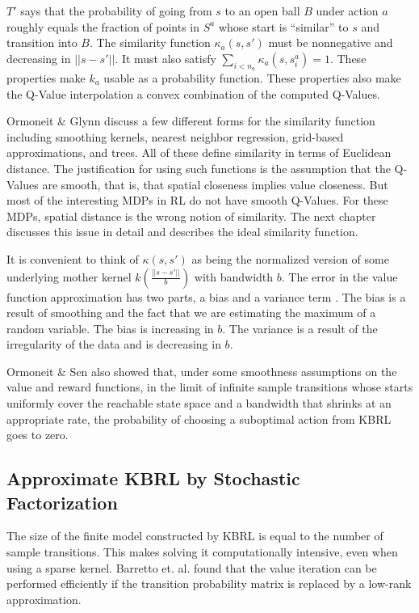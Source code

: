 $T'$ says that the probability of going from $s$ to an open ball $B$ 
under action $a$ roughly equals the fraction of points in $S^a$ whose 
start is ``similar'' to $s$ and transition into $B$.
The similarity function $\kappa_a(s,s')$ must be nonnegative and decreasing in
$||s - s'||$.
It must also satisfy $\sum_{i < n_a} \kappa_a(s,s^a_i) = 1$.
These properties make $k_a$ usable as a probability function.
These properties also make the Q-Value interpolation a convex combination
of the computed Q-Values.

Ormoneit \& Glynn \cite{kbrl2} discuss a few different forms for the similarity 
function including smoothing kernels, nearest neighbor 
regression, grid-based approximations, and trees.
All of these define similarity in terms of Euclidean distance.
The justification for using such functions is the assumption that the
Q-Values are smooth, that is, that spatial closeness implies value closeness.
But most of the interesting MDPs in RL do not have smooth Q-Values.
For these MDPs, spatial distance is the wrong notion of similarity.
The next chapter discusses this issue in detail and describes the ideal
similarity function.

It is convenient to think of $\kappa(s,s')$ as being the normalized version
of some underlying mother kernel $k(\frac{||s-s'||}{b})$ with bandwidth $b$.
The error in the value function approximation 
has two parts, a bias and a variance term \cite{kbrl}.
The bias is a result of smoothing and the fact that we are estimating
the maximum of a random variable. The bias is increasing in $b$.
The variance is a result of the irregularity of the data and is decreasing
in $b$.

Ormoneit \& Sen \cite{kbrl} also showed that, under some smoothness
assumptions on
the value and reward functions, in the limit of infinite sample transitions
whose starts uniformly cover the reachable state space and a
bandwidth that shrinks at an appropriate rate, the probability of choosing
a suboptimal action from KBRL goes to zero.

\subsection{Approximate KBRL by Stochastic Factorization}
The size of the finite model constructed by KBRL is equal to the number of
sample transitions.
This makes solving it computationally intensive, even when using a sparse
kernel.
Barretto et. al. \cite{kbsf} found that the value iteration can be performed efficiently if
the transition probability matrix is replaced by a low-rank approximation.

